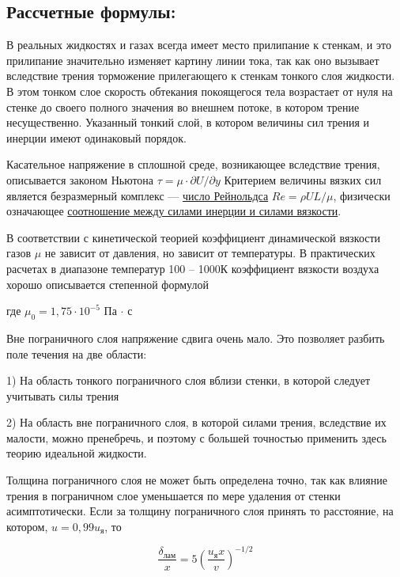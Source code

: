 \documentclass[a4paper]{article}
\begin{document}
\subsection*{Рассчетные формулы:}
В реальных жидкостях и газах всегда имеет место прилипание к стенкам, и это прилипание значительно изменяет картину линии тока, так как оно вызывает вследствие трения торможение прилегающего к стенкам тонкого слоя жидкости. В этом тонком слое скорость обтекания покоящегося тела возрастает от нуля на стенке до своего полного значения во внешнем потоке, в котором трение несущественно. Указанный тонкий слой, в котором величины сил трения и инерции имеют одинаковый порядок.

Касательное напряжение в сплошной среде, возникающее вследствие трения, описывается законом Ньютона $\tau = \mu \cdot \partial U / \partial y$ Критерием величины вязких сил является безразмерный комплекс — \underline{число Рейнольдса} $Re = \rho U L / \mu$, физически означающее \underline{соотношение между силами инерции и силами вязкости}.

В соответствии с кинетической теорией коэффициент динамической вязкости газов $\mu$ не зависит от давления, но зависит от температуры. В практических расчетах в диапазоне температур 100 – 1000К коэффициент вязкости воздуха хорошо описывается степенной формулой

\begin{center}
\end{center}


где $\mu_0 = 1,75 \cdot 10^{-5}$ Па $\cdot$ с
\vspace{0.5cm}
\par
Вне пограничного слоя напряжение сдвига очень мало. Это позволяет разбить поле течения на две области: \par
1) На область тонкого пограничного слоя вблизи стенки, в которой следует учитывать силы трения \par
2) На область вне пограничного слоя, в которой силами трения, вследствие их малости, можно пренебречь, и поэтому с большей точностью применить здесь теорию идеальной жидкости.

Толщина пограничного слоя не может быть определена точно, так как влияние трения в пограничном слое
уменьшается по мере удаления от стенки асимптотически. Если за толщину пограничного слоя принять то
расстояние, на котором, $u = 0, 99u_\text{я}$, то

$$\frac{\delta_\text{лам}}{x} = 5 (\frac{u_\text{я} x}{v})^{-1/2}$$
\end{document}
